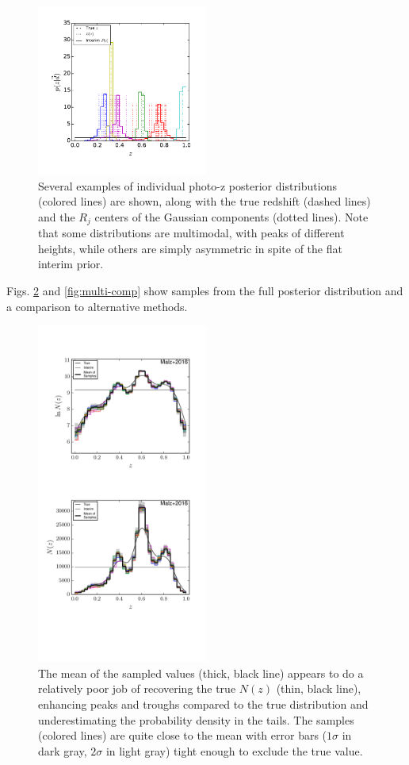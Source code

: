 \documentclass[preprint]{aastex}
\begin{document}
\begin{figure}
\includegraphics[width=0.5\textwidth]{figs/mult/samplepzs.pdf}
\caption{Several examples of individual photo-z posterior distributions 
(colored lines) are shown, along with the true redshift (dashed lines) and the 
$R_{j}$ centers of the Gaussian components (dotted lines).  Note that some 
distributions are multimodal, with peaks of different heights, while others are 
simply asymmetric in spite of the flat interim prior.}
\label{fig:multipzs}
\end{figure}

Figs. \ref{fig:multi-samp} and \ref{fig:multi-comp} show samples from the full 
posterior distribution and a comparison to alternative methods.  

\begin{figure}
\includegraphics[width=0.5\textwidth]{figs/mult/samps.pdf}
\caption{The mean of the sampled values (thick, black line) appears to do a 
relatively poor job of recovering the true $N(z)$ (thin, black line), enhancing 
peaks and troughs compared to the true distribution and underestimating the 
probability density in the tails.  The samples (colored lines) are quite close 
to the mean with error bars ($1\sigma$ in dark gray, $2\sigma$ in light gray) 
tight enough to exclude the true value.}
\label{fig:multi-samp}
\end{figure}
\end{document}
